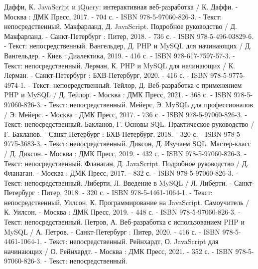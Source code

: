 
\begin{thebibliography}{9}

     Даффи, К. JavaScript и jQuery: интерактивная веб-разработка / К. Даффи. - Москва : ДМК Пресс, 2017. - 704 с. - ISBN 978-5-97060-826-3. - Текст: непосредственный.
     Макфарланд, Д. JavaScript. Подробное руководство / Д. Макфарланд. - Санкт-Петербург : Питер, 2018. - 736 с. - ISBN 978-5-496-03829-6. - Текст: непосредственный.
     Вангельдер, Д. PHP и MySQL для начинающих / Д. Вангельдер. - Киев : Диалектика, 2019. - 416 с. - ISBN 978-617-7597-57-3. - Текст: непосредственный.
    	Лерман, К. PHP и MySQL для начинающих / К. Лерман. - Санкт-Петербург : БХВ-Петербург, 2020. - 416 с. - ISBN 978-5-9775-4974-1. - Текст: непосредственный.
		Тейлор, Д. Веб-разработка с применением PHP и MySQL / Д. Тейлор. - Москва : ДМК Пресс, 2021. - 368 с. - ISBN 978-5-97060-826-3. - Текст: непосредственный.
	 Мейерс, Э. MySQL для профессионалов / Э. Мейерс. - Москва : ДМК Пресс, 2017. - 736 с. - ISBN 978-5-97060-826-3. - Текст: непосредственный.
	 Бакланов, Г. Основы SQL. Практическое руководство / Г. Бакланов. - Санкт-Петербург : БХВ-Петербург, 2018. - 320 с. - ISBN 978-5-9775-3683-3. - Текст: непосредственный.
		Диксон, Д. Изучаем SQL. Мастер-класс / Д. Диксон. - Москва : ДМК Пресс, 2019. - 432 с. - ISBN 978-5-97060-826-3. - Текст: непосредственный.
		Фланаган, Д. JavaScript. Подробное руководство / Д. Фланаган. - Москва : ДМК Пресс, 2017. - 832 с. - ISBN 978-5-97060-826-3. - Текст: непосредственный.
		Либерти, Л. Введение в MySQL / Л. Либерти. - Санкт-Петербург : Питер, 2018. - 320 с. - ISBN 978-5-4461-1064-1. - Текст: непосредственный.  
		Уилсон, К. Программирование на JavaScript. Самоучитель / К. Уилсон. - Москва : ДМК Пресс, 2019. - 448 с. - ISBN 978-5-97060-826-3. - Текст: непосредственный.
		Петров, А. Веб-разработка с использованием PHP и MySQL / А. Петров. - Санкт-Петербург : Питер, 2020. - 416 с. - ISBN 978-5-4461-1064-1. - Текст: непосредственный. 
	 Рейнхардт, О. JavaScript для начинающих / О. Рейнхардт. - Москва : ДМК Пресс, 2021. - 352 с. - ISBN 978-5-97060-826-3. - Текст: непосредственный.
\end{thebibliography}
